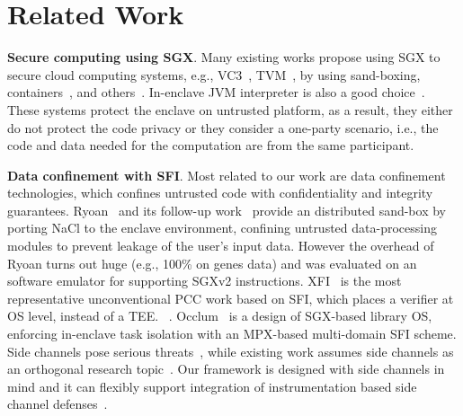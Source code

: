 \section{Related Work}\label{sec-relatedwork}

\vspace{3pt}\noindent\textbf{Secure computing using SGX}.
Many existing works propose using SGX to secure cloud computing systems, e.g., VC3~\cite{schuster2015vc3}, TVM~\cite{hynes2018efficient}, by using 
sand-boxing, containers~\cite{tian2019practical}, and others~\cite{shinde2017panoply,shanker2020evaluation}. 
In-enclave JVM interpreter is also a good choice~\cite{jiang2020uranus}. These systems protect the enclave on untrusted platform, as a result, they either do not protect the code privacy or they consider a one-party scenario, i.e., the code and data needed for the computation are from the same participant. 

\vspace{3pt}\noindent\textbf{Data confinement with SFI}.
Most related to our work are data confinement technologies, which confines untrusted code with confidentiality and integrity guarantees. Ryoan~\cite{hunt2018ryoan} and its follow-up work~\cite{hunt2018chiron} provide an distributed sand-box by porting NaCl to the enclave environment, confining untrusted data-processing modules to prevent leakage of the user’s input data. However the overhead of Ryoan turns out huge (e.g., 100\% on genes data) and was evaluated on an software emulator for supporting SGXv2 instructions.
XFI~\cite{erlingsson2006xfi} is the most representative unconventional PCC work based on SFI, which places a verifier at OS level, instead of a TEE. ~\cite{zhou2014armlock,tan2017principles}. Occlum~\cite{shen2020occlum} is
a design of SGX-based library OS, enforcing in-enclave task isolation with an MPX-based multi-domain SFI scheme. 
Side channels pose serious threats~\cite{lee2017inferring,wang2017leaky,van2018foreshadow,chen2019sgxpectre}, while existing work assumes side channels as an orthogonal research topic~\cite{sinha2015moat,subramanyan2017formal,shen2020occlum}. 
Our framework is designed with side channels in mind and it can flexibly support integration of instrumentation based side channel defenses~\cite{shinde2016preventing,shih2017t,oleksenko2018varys,sinha2017compiler,chen2018racing}.

